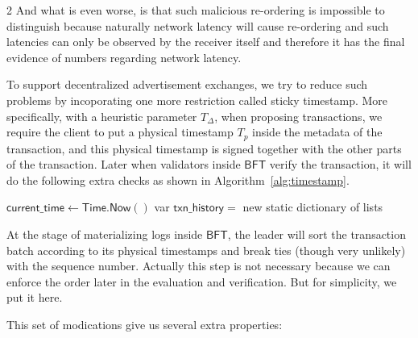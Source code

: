 \documentclass[9pt,oneside]{amsart}
\begin{document}
\begin{multicols}{2}
And what is even worse, is that such malicious re-ordering is impossible to distinguish because naturally network latency will cause re-ordering and such latencies
can only be observed by the receiver itself and therefore it has the final evidence of numbers regarding network latency.

To support decentralized advertisement exchanges, we try to reduce such problems by incoporating one more restriction called sticky timestamp.
More specifically, with a heuristic parameter $T_\Delta$, when proposing transactions, we require the client to put a physical timestamp $T_p$ inside
the metadata of the transaction, and this physical timestamp is signed together with the other parts of the transaction. Later when validators inside
$\mathsf{BFT}$ verify the transaction, it will do the following extra checks as shown in Algorithm~\ref{alg:timestamp}.

\begin{figure*}
\begin{algorithm}[H]
$\mathsf{current\_time} \gets \mathsf{Time.Now()}$\;
var $\mathsf{txn\_history=}$ new static dictionary of lists\;
\caption{Extra Verification Regarding Physcal Timestamp}
\label{alg:timestamp}
\end{algorithm}
\caption{Pseudo-Code for Extra Verification}
\end{figure*}

At the stage of materializing logs inside $\mathsf{BFT}$, the leader will sort the transaction batch according to its physical timestamps and break ties
(though very unlikely) with the sequence number. Actually this step is not necessary because we can enforce the order later in the evaluation and verification.
But for simplicity, we put it here.

This set of modications give us several extra properties:


\end{multicols}
\end{document}
